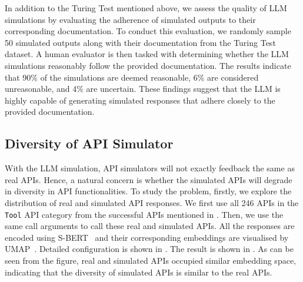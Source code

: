In addition to the Turing Test mentioned above, we assess the quality of LLM simulations by evaluating the adherence of simulated outputs to their corresponding documentation. To conduct this evaluation, we randomly sample 50 simulated outputs along with their documentation from the Turing Test dataset. A human evaluator is then tasked with determining whether the LLM simulations reasonably follow the provided documentation. The results indicate that 90\% of the simulations are deemed reasonable, 6\% are considered unreasonable, and 4\% are uncertain. These findings suggest that the LLM is highly capable of generating simulated responses that adhere closely to the provided documentation.



\subsection{Diversity of API Simulator}
With the LLM simulation, API simulators will not exactly feedback the same as real APIs. 
Hence, a natural concern is whether the simulated APIs will degrade in diversity in API functionalities.
To study the problem, firstly, we explore the distribution of real and simulated API responses.
We first use all 246 APIs in the \texttt{Tool} API category from the successful APIs mentioned in .
Then, we use the same call arguments to call these real and simulated APIs.
All the responses are encoded using S-BERT~\cite{reimers-2019-sentence-bert} and their corresponding embeddings are visualised by UMAP~\cite{mcinnes2018umap-software}. 
Detailed configuration is shown in .
The result is shown in . As can be seen from the figure, real and simulated APIs occupied similar embedding space, indicating that the diversity of simulated APIs is similar to the real APIs.

